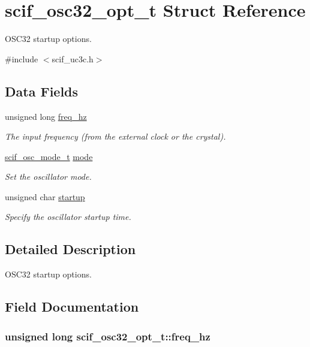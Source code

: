 \hypertarget{structscif__osc32__opt__t}{
\section{scif\-\_\-osc32\-\_\-opt\-\_\-t \-Struct \-Reference}
\label{structscif__osc32__opt__t}
}


\-O\-S\-C32 startup options.  




{\ttfamily \#include $<$scif\-\_\-uc3c.\-h$>$}

\subsection*{\-Data \-Fields}
\begin{DoxyCompactItemize}
\item 
unsigned long \hyperlink{structscif__osc32__opt__t_a9e4a17285bc2cc6741ae58d5821dfb75}{freq\-\_\-hz}
\begin{DoxyCompactList}\small\item\em \-The input frequency (from the external clock or the crystal). \end{DoxyCompactList}\item 
\hyperlink{scif__uc3c_8h_a9a708e94c5df197717f5859f6b8b257c}{scif\-\_\-osc\-\_\-mode\-\_\-t} \hyperlink{structscif__osc32__opt__t_a9c5abc962b1b136103403be646983e21}{mode}
\begin{DoxyCompactList}\small\item\em \-Set the oscillator mode. \end{DoxyCompactList}\item 
unsigned char \hyperlink{structscif__osc32__opt__t_af5305417f3897eb2e3b178485e99238f}{startup}
\begin{DoxyCompactList}\small\item\em \-Specify the oscillator startup time. \end{DoxyCompactList}\end{DoxyCompactItemize}


\subsection{\-Detailed \-Description}
\-O\-S\-C32 startup options. 

\subsection{\-Field \-Documentation}
\hypertarget{structscif__osc32__opt__t_a9e4a17285bc2cc6741ae58d5821dfb75}{
\subsubsection[{freq\-\_\-hz}]{\setlength{\rightskip}{0pt plus 5cm}unsigned long {\bf scif\-\_\-osc32\-\_\-opt\-\_\-t\-::freq\-\_\-hz}}}
\label{structscif__osc32__opt__t_a9e4a17285bc2cc6741ae58d5821dfb75}


